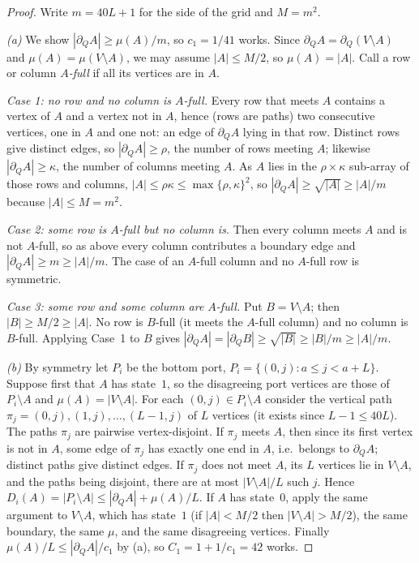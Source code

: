 \documentclass[11pt,a4paper]{article}
\theoremstyle{plain}
\theoremstyle{definition}
\theoremstyle{remark}
\begin{document}
\label{pf:block}
\lemblock*
\begin{proof}
Write $m=40L+1$ for the side of the grid and $M=m^2$.

\emph{(a)} We show $|\partial_QA|\ge\mu(A)/m$, so $c_1=1/41$ works. Since $\partial_QA=\partial_Q(V\setminus A)$ and $\mu(A)=\mu(V\setminus A)$, we may assume $|A|\le M/2$, so $\mu(A)=|A|$. Call a row or column \emph{$A$-full} if all its vertices are in $A$.

\emph{Case 1: no row and no column is $A$-full.} Every row that meets $A$ contains a vertex of $A$ and a vertex not in $A$, hence (rows are paths) two consecutive vertices, one in $A$ and one not: an edge of $\partial_QA$ lying in that row. Distinct rows give distinct edges, so $|\partial_QA|\ge\rho$, the number of rows meeting $A$; likewise $|\partial_QA|\ge\kappa$, the number of columns meeting $A$. As $A$ lies in the $\rho\times\kappa$ sub-array of those rows and columns, $|A|\le\rho\kappa\le\max\{\rho,\kappa\}^2$, so $|\partial_QA|\ge\sqrt{|A|}\ge|A|/m$ because $|A|\le M=m^2$.

\emph{Case 2: some row is $A$-full but no column is.} Then every column meets $A$ and is not $A$-full, so as above every column contributes a boundary edge and $|\partial_QA|\ge m\ge|A|/m$. The case of an $A$-full column and no $A$-full row is symmetric.

\emph{Case 3: some row and some column are $A$-full.} Put $B=V\setminus A$; then $|B|\ge M/2\ge|A|$. No row is $B$-full (it meets the $A$-full column) and no column is $B$-full. Applying Case~1 to $B$ gives $|\partial_QA|=|\partial_QB|\ge\sqrt{|B|}\ge|B|/m\ge|A|/m$.

\emph{(b)} By symmetry let $P_i$ be the bottom port, $P_i=\{(0,j):a\le j<a+L\}$. Suppose first that $A$ has state~$1$, so the disagreeing port vertices are those of $P_i\setminus A$ and $\mu(A)=|V\setminus A|$. For each $(0,j)\in P_i\setminus A$ consider the vertical path $\pi_j=(0,j),(1,j),\dots,(L-1,j)$ of $L$ vertices (it exists since $L-1\le40L$). The paths $\pi_j$ are pairwise vertex-disjoint. If $\pi_j$ meets $A$, then since its first vertex is not in $A$, some edge of $\pi_j$ has exactly one end in $A$, i.e.\ belongs to $\partial_QA$; distinct paths give distinct edges. If $\pi_j$ does not meet $A$, its $L$ vertices lie in $V\setminus A$, and the paths being disjoint, there are at most $|V\setminus A|/L$ such $j$. Hence $D_i(A)=|P_i\setminus A|\le|\partial_QA|+\mu(A)/L$. If $A$ has state~$0$, apply the same argument to $V\setminus A$, which has state~$1$ (if $|A|<M/2$ then $|V\setminus A|>M/2$), the same boundary, the same $\mu$, and the same disagreeing vertices. Finally $\mu(A)/L\le|\partial_QA|/c_1$ by (a), so $C_1=1+1/c_1=42$ works.


\end{proof}
\end{document}
